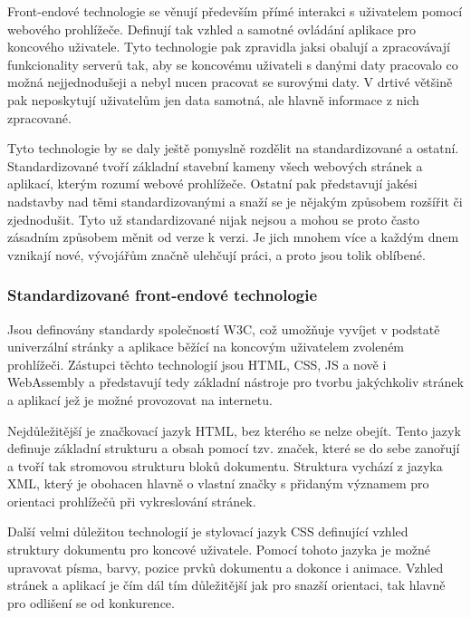 \begin{itemize}
\begin{itemize}
	Front-endové technologie se věnují především přímé interakci s uživatelem pomocí webového prohlížeče.
	Definují tak vzhled a samotné ovládání aplikace pro koncového uživatele.
	Tyto technologie pak zpravidla jaksi obalují a zpracovávají funkcionality serverů tak, aby se koncovému uživateli s danými
	daty pracovalo co možná nejjednodušeji a nebyl nucen pracovat se surovými daty.
	V drtivé většině pak neposkytují uživatelům jen data samotná, ale hlavně informace z nich zpracované.

	Tyto technologie by se daly ještě pomyslně rozdělit na standardizované a ostatní.
	Standardizované tvoří základní stavební kameny všech webových stránek a aplikací, kterým rozumí webové
	prohlížeče.
	Ostatní pak představují jakési nadstavby nad těmi standardizovanými a snaží se je nějakým způsobem rozšířit
	či zjednodušit.
	Tyto už standardizované nijak nejsou a mohou se proto často zásadním způsobem měnit od verze k verzi.
	Je jich mnohem více a každým dnem vznikají nové, vývojářům značně ulehčují práci, a proto jsou tolik oblíbené.

		\subsubsection{Standardizované front-endové technologie}

		Jsou definovány standardy společností W3C, což umožňuje vyvíjet v podstatě univerzální stránky a aplikace běžící na
		koncovým uživatelem zvoleném prohlížeči.
		Zástupci těchto technologií jsou HTML, CSS, \ac{JS} a nově i WebAssembly a představují tedy základní
		nástroje pro tvorbu jakýchkoliv stránek a aplikací jež je možné provozovat na internetu. \cite{w3c_webdesign}

		Nejdůležitější je značkovací jazyk \noindent\Ac{HTML}, bez kterého se nelze obejít.
		Tento jazyk definuje základní strukturu a obsah pomocí tzv. značek, které se do sebe zanořují a
		tvoří tak stromovou strukturu bloků dokumentu.
		Struktura vychází z jazyka \noindent\Ac{XML}, který je obohacen hlavně
		o vlastní značky s přidaným významem pro orientaci prohlížečů při vykreslování stránek. \cite{html_hypertext_markup_language}

		Další velmi důležitou technologií je stylovací jazyk \noindent\Ac{CSS} definující vzhled struktury
		dokumentu pro koncové uživatele.
		Pomocí tohoto jazyka je možné upravovat písma, barvy, pozice prvků dokumentu a dokonce i animace.
		Vzhled stránek a aplikací je čím dál tím důležitější jak pro snazší orientaci, tak hlavně pro odlišení se od konkurence.
		\cite{css_cascading_style_sheets}


\end{itemize}
\end{itemize}
